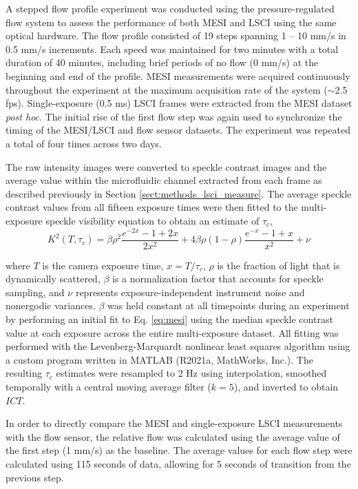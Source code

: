 \documentclass[12pt]{spieman}
\begin{document}
\begin{spacing}{2}
A stepped flow profile experiment was conducted using the pressure-regulated flow system to assess the performance of both MESI and LSCI using the same optical hardware. The flow profile consisted of 19 steps spanning 1 -- 10 mm/s in 0.5 mm/s increments. Each speed was maintained for two minutes with a total duration of 40 minutes, including brief periods of no flow (0 mm/s) at the beginning and end of the profile. MESI measurements were acquired continuously throughout the experiment at the maximum acquisition rate of the system ($\sim$2.5 fps). Single-exposure (0.5 ms) LSCI frames were extracted from the MESI dataset \textit{post hoc}. The initial rise of the first flow step was again used to synchronize the timing of the MESI/LSCI and flow sensor datasets. The experiment was repeated a total of four times across two days.

The raw intensity images were converted to speckle contrast images and the average value within the microfluidic channel extracted from each frame as described previously in Section \ref{sect:methods_lsci_measure}. The average speckle contrast values from all fifteen exposure times were then fitted to the multi-exposure speckle visibility equation \cite{Parthasarathy:2008el} to obtain an estimate of $\tau_c$,
%
\begin{equation}
    \label{eq:mesi}
    K^2(T,\tau_c) =
        \beta\rho^2\frac{e^{-2x} - 1 + 2x}{2x^2} +
        4\beta\rho(1 - \rho)\frac{e^{-x} - 1 + x}{x^2} +
        \nu
\end{equation}

\noindent where $T$ is the camera exposure time, $x=T/\tau_c$, $\rho$ is the fraction of light that is dynamically scattered, $\beta$ is a normalization factor that accounts for speckle sampling, and $\nu$ represents exposure-independent instrument noise and nonergodic variances. $\beta$ was held constant at all timepoints during an experiment by performing an initial fit to Eq. \ref{eq:mesi} using the median speckle contrast value at each exposure across the entire multi-exposure dataset. All fitting was performed with the Levenberg-Marquardt nonlinear least squares algorithm \cite{Lourakis:J2fCMU5i} using a custom program written in MATLAB (R2021a, MathWorks, Inc.). The resulting $\tau_c$ estimates were resampled to 2 Hz using interpolation, smoothed temporally with a central moving average filter ($k=5$), and inverted to obtain $ICT$.

In order to directly compare the MESI and single-exposure LSCI measurements with the flow sensor, the relative flow was calculated using the average value of the first step (1 mm/s) as the baseline. The average values for each flow step were calculated using 115 seconds of data, allowing for 5 seconds of transition from the previous step.



\end{spacing}
\end{document}
